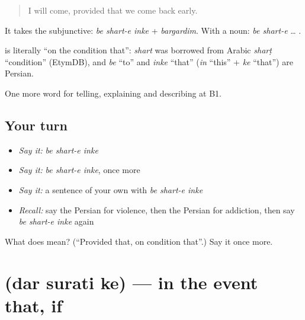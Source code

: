 \begin{quote}
I will come, provided that we come back early.
\end{quote}

It takes the subjunctive: \emph{be shart-e inke} + \emph{bargardim}. With a noun: \emph{be shart-e} … .

\begin{cousinweb}
\textbf{  } is literally \textquotedblleft{}on the condition that\textquotedblright{}: \emph{shart} was borrowed from Arabic \emph{sharṭ} \textquotedblleft{}condition\textquotedblright{} (EtymDB), and \emph{be} \textquotedblleft{}to\textquotedblright{} and \emph{inke} \textquotedblleft{}that\textquotedblright{} (\emph{in} \textquotedblleft{}this\textquotedblright{} + \emph{ke} \textquotedblleft{}that\textquotedblright{}) are Persian.
\end{cousinweb}

\begin{grammarlens}[title={What you've built}]
One more word for telling, explaining and describing at B1.
\end{grammarlens}

\subsection*{Your turn}
\begin{itemize}
\raggedright
  \item \emph{Say it:} \emph{be shart-e inke}
  \item \emph{Say it:} \emph{be shart-e inke}, once more
  \item \emph{Say it:} a sentence of your own with \emph{be shart-e inke}
  \item \emph{Recall:} say the Persian for violence, then the Persian for addiction, then say \emph{be shart-e inke} again
\end{itemize}

\begin{tcolorbox}[breakable,colback=teal!4,colframe=teal!35!black,title={Before you move on}]
What does    mean? (\textquotedblleft{}Provided that, on condition that\textquotedblright{}.) Say it once more.
\end{tcolorbox}
\section[\texorpdfstring{\fa{در} \fa{صورتی} \fa{که} (dar surati ke)}{در صورتی که (dar surati ke)}]{   (dar surati ke) — in the event that, if}

